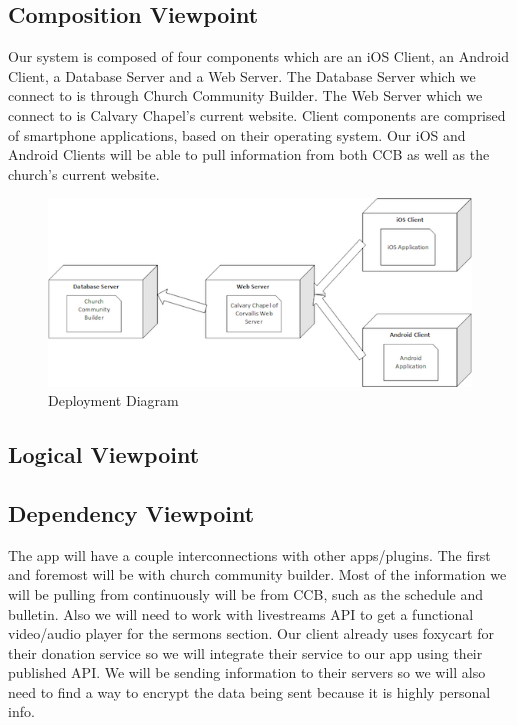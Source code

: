 \documentclass[letterpaper,10pt,draftclsnofoot,onecolumn,titlepage]{IEEEtran}
\begin{document}
		\subsection{Composition Viewpoint}
			Our system is composed of four components which are an iOS Client, an Android Client, a Database Server and a Web Server.
			The Database Server which we connect to is through Church Community Builder.
			The Web Server which we connect to is Calvary Chapel's current website.
			Client components are comprised of smartphone applications, based on their operating system.
			Our iOS and Android Clients will be able to pull information from both CCB as well as the church's current website.

		\begin{figure}[H]
			\centering
			\includegraphics[natwidth=552, natheight=245]{Deployment.png}
			\caption{Deployment Diagram}
			\label{fig:deployment}
		\end{figure}

		\subsection{Logical Viewpoint}

		\subsection{Dependency Viewpoint}
			The app will have a couple interconnections with other apps/plugins.
			The first and foremost will be with church community builder.
			Most of the information we will be pulling from continuously will be from CCB, such as the schedule and bulletin.
			Also we will need to work with livestreams API to get a functional video/audio player for the sermons section.
			Our client already uses foxycart for their donation service so we will integrate their service to our app using their published API.
			We will be sending information to their servers so we will also need to find a way to encrypt the data being sent because it is highly personal info.
\end{document}
